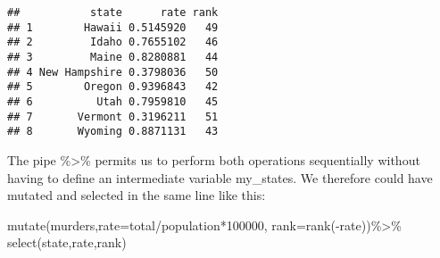 \documentclass[
]{article}
\newenvironment{Shaded}{\begin{snugshade}}{\end{snugshade}}
\newcommand{\AttributeTok}[1]{\textcolor[rgb]{0.77,0.63,0.00}{#1}}
\newcommand{\DecValTok}[1]{\textcolor[rgb]{0.00,0.00,0.81}{#1}}
\newcommand{\FunctionTok}[1]{\textcolor[rgb]{0.00,0.00,0.00}{#1}}
\newcommand{\NormalTok}[1]{#1}
\newcommand{\SpecialCharTok}[1]{\textcolor[rgb]{0.00,0.00,0.00}{#1}}
\begin{document}
\begin{verbatim}
##           state      rate rank
## 1        Hawaii 0.5145920   49
## 2         Idaho 0.7655102   46
## 3         Maine 0.8280881   44
## 4 New Hampshire 0.3798036   50
## 5        Oregon 0.9396843   42
## 6          Utah 0.7959810   45
## 7       Vermont 0.3196211   51
## 8       Wyoming 0.8871131   43
\end{verbatim}

The pipe \%\textgreater\% permits us to perform both operations
sequentially without having to define an intermediate variable
my\_states. We therefore could have mutated and selected in the same
line like this:

\begin{Shaded}
\begin{Highlighting}[]
\FunctionTok{mutate}\NormalTok{(murders,}\AttributeTok{rate=}\NormalTok{total}\SpecialCharTok{/}\NormalTok{population}\SpecialCharTok{*}\DecValTok{100000}\NormalTok{,}
       \AttributeTok{rank=}\FunctionTok{rank}\NormalTok{(}\SpecialCharTok{{-}}\NormalTok{rate))}\SpecialCharTok{\%\textgreater{}\%}
  \FunctionTok{select}\NormalTok{(state,rate,rank)}
\end{Highlighting}
\end{Shaded}
\end{document}
